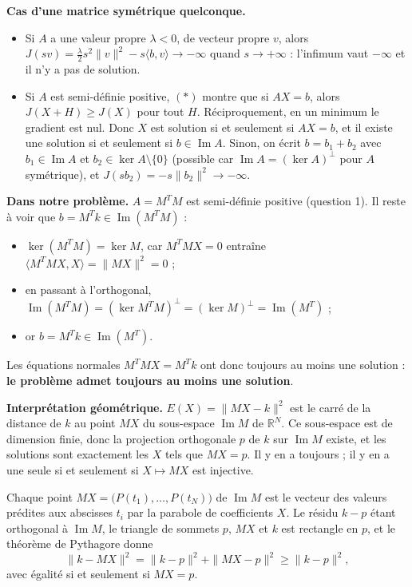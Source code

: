 {\begin{enumerate}
{  \textbf{Cas d'une matrice symétrique quelconque.}
  \begin{itemize}
    \item Si $A$ a une valeur propre $\lambda < 0$, de vecteur propre $v$, alors $J(sv) = \frac{\lambda}{2} s^2 \|v\|^2 - s \langle b, v \rangle \to -\infty$ quand $s \to +\infty$ : l'infimum vaut $-\infty$ et il n'y a pas de solution.
    \item Si $A$ est semi-définie positive, $(\ast)$ montre que si $AX = b$, alors $J(X + H) \geq J(X)$ pour tout $H$. Réciproquement, en un minimum le gradient est nul. Donc $X$ est solution si et seulement si $AX = b$, et il existe une solution si et seulement si $b \in \operatorname{Im} A$. Sinon, on écrit $b = b_1 + b_2$ avec $b_1 \in \operatorname{Im} A$ et $b_2 \in \ker A \setminus \{0\}$ (possible car $\operatorname{Im} A = (\ker A)^\perp$ pour $A$ symétrique), et $J(s b_2) = -s \|b_2\|^2 \to -\infty$.
  \end{itemize}

  \textbf{Dans notre problème.} $A = M^T M$ est semi-définie positive (question 1). Il reste à voir que $b = M^T k \in \operatorname{Im}(M^T M)$ :
  \begin{itemize}
    \item $\ker(M^T M) = \ker M$, car $M^T M X = 0$ entraîne $\langle M^T M X, X \rangle = \|MX\|^2 = 0$ ;
    \item en passant à l'orthogonal, $\operatorname{Im}(M^T M) = (\ker M^T M)^\perp = (\ker M)^\perp = \operatorname{Im}(M^T)$ ;
    \item or $b = M^T k \in \operatorname{Im}(M^T)$.
  \end{itemize}
  Les équations normales $M^T M X = M^T k$ ont donc toujours au moins une solution : \textbf{le problème admet toujours au moins une solution}.

  \textbf{Interprétation géométrique.} $E(X) = \|MX - k\|^2$ est le carré de la distance de $k$ au point $MX$ du sous-espace $\operatorname{Im} M$ de $\mathbb{R}^N$. Ce sous-espace est de dimension finie, donc la projection orthogonale $p$ de $k$ sur $\operatorname{Im} M$ existe, et les solutions sont exactement les $X$ tels que $MX = p$. Il y en a toujours ; il y en a une seule si et seulement si $X \mapsto MX$ est injective.

  Chaque point $MX = \big(P(t_1), \dots, P(t_N)\big)$ de $\operatorname{Im} M$ est le vecteur des valeurs prédites aux abscisses $t_i$ par la parabole de coefficients $X$. Le résidu $k - p$ étant orthogonal à $\operatorname{Im} M$, le triangle de sommets $p$, $MX$ et $k$ est rectangle en $p$, et le théorème de Pythagore donne
  \[
  \|k - MX\|^2 = \|k - p\|^2 + \|MX - p\|^2 \geq \|k - p\|^2,
  \]
  avec égalité si et seulement si $MX = p$.

}
\end{enumerate}}
